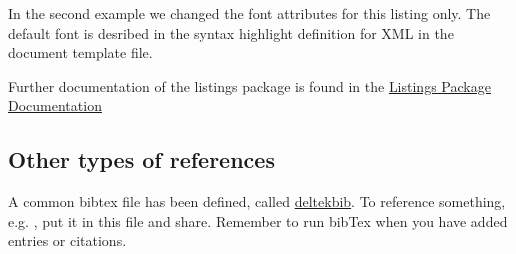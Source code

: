 \lstset{language=XML,
	   includerangemarker=false,
	   rangebeginprefix=<,
	   rangeendprefix=</,
	   rangesuffix=>}
	   


In the second example we changed the font attributes for this listing only. The default font is desribed in the syntax highlight definition for XML in the document template file. 

Further documentation of the listings package is found in the \href{http://mirror.jmu.edu/pub/CTAN/macros/latex/contrib/listings/listings.pdf}{Listings Package Documentation}

\subsection{Other types of references}
A common bibtex file has been defined, called \href{file:./deltekbib.bib}{deltekbib}. To reference something, e.g. \cite{cleancode}, put it in this file and share. Remember to run bibTex when you have added entries or citations. 


